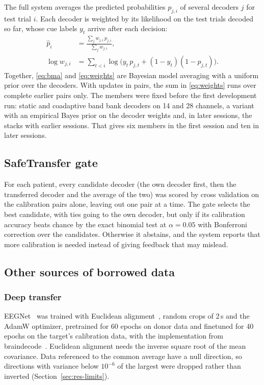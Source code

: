 \documentclass{ieeeaccess}
\begin{document}
The full system averages the predicted probabilities $p_{j,i}$ of several decoders $j$ for test trial $i$. Each decoder is weighted by its likelihood on the test trials decoded so far, whose cue labels $y_t$ arrive after each decision:
\begin{align}
\hat p_i &= \frac{\sum_j w_{j,i}\, p_{j,i}}{\sum_j w_{j,i}},\label{eq:bma}\\
\log w_{j,i} &= \sum_{t < i} \log\bigl(y_t\, p_{j,t} + (1 - y_t)(1 - p_{j,t})\bigr).\label{eq:weights}
\end{align}
Together, \eqref{eq:bma} and \eqref{eq:weights} are Bayesian model averaging with a uniform prior over the decoders. With updates in pairs, the sum in \eqref{eq:weights} runs over complete earlier pairs only. The members were fixed before the first development run: static and coadaptive band bank decoders on 14 and 28 channels, a variant with an empirical Bayes prior on the decoder weights and, in later sessions, the stacks with earlier sessions. That gives six members in the first session and ten in later sessions.

\subsection{SafeTransfer gate}\label{sec:gate-method}

For each patient, every candidate decoder (the own decoder first, then the transferred decoder and the average of the two) was scored by cross validation on the calibration pairs alone, leaving out one pair at a time. The gate selects the best candidate, with ties going to the own decoder, but only if its calibration accuracy beats chance by the exact binomial test at $\alpha = 0.05$ with Bonferroni correction over the candidates. Otherwise it abstains, and the system reports that more calibration is needed instead of giving feedback that may mislead.

\subsection{Other sources of borrowed data}\label{sec:sources}

\subsubsection{Deep transfer} EEGNet~\cite{lawhern2018} was trained with Euclidean alignment~\cite{he2020}, random crops of 2\,s and the AdamW optimizer, pretrained for 60 epochs on donor data and finetuned for 40 epochs on the target's calibration data, with the implementation from braindecode~\cite{schirrmeister2017}. Euclidean alignment needs the inverse square root of the mean covariance. Data referenced to the common average have a null direction, so directions with variance below $10^{-6}$ of the largest were dropped rather than inverted (Section~\ref{sec:res-limits}).
\end{document}
